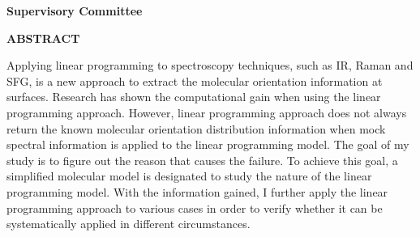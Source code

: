 \newpage
{}

\noindent \textbf{Supervisory Committee}
\tpbreak
\panel

\begin{center}
\textbf{ABSTRACT}
\end{center}


Applying linear programming to spectroscopy techniques, such as IR, Raman and SFG, is a new approach to extract the molecular orientation information at surfaces. Research has shown the computational gain when using the linear programming approach. However, linear programming approach does not always return the known molecular orientation distribution information when mock spectral information is applied to the linear programming model. The goal of my study is to figure out the reason that causes the failure. To achieve this goal, a simplified molecular model is designated to study the nature of the linear programming model. With the information gained, I further apply the linear programming approach to various cases in order to verify whether it can be systematically applied in different circumstances.  